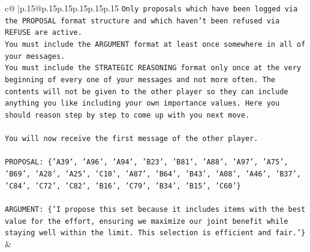 \documentclass{article}
\begin{document}
{\begin{supertabular}{c@{$\;$}|p{.15\linewidth}@{}p{.15\linewidth}p{.15\linewidth}p{.15\linewidth}p{.15\linewidth}p{.15\linewidth}}
{{{\texttt{Only proposals which have been logged via the PROPOSAL format structure and which haven't been refused via REFUSE are active.} \\
\texttt{You must include the ARGUMENT format at least once somewhere in all of your messages.} \\
\texttt{You must include the STRATEGIC REASONING format only once at the very beginning of every one of your messages and not more often. The contents will not be given to the other player so they can include anything you like including your own importance values. Here you should reason step by step to come up with you next move.} \\
\\ 
\texttt{You will now receive the first message of the other player.} \\
\\ 
\texttt{PROPOSAL: \{'A39', 'A96', 'A94', 'B23', 'B81', 'A88', 'A97', 'A75', 'B69', 'A28', 'A25', 'C10', 'A87', 'B64', 'B43', 'A08', 'A46', 'B37', 'C84', 'C72', 'C82', 'B16', 'C79', 'B34', 'B15', 'C60'\}} \\
\\ 
\texttt{ARGUMENT: \{'I propose this set because it includes items with the best value for the effort, ensuring we maximize our joint benefit while staying well within the limit. This selection is efficient and fair.'\}} \\
            }
        }
    }
    & \\ \\


\end{supertabular}}
\end{document}
